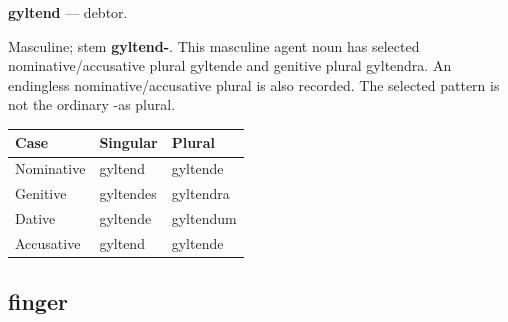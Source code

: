 \par\begin{minipage}{\linewidth}\raggedright
\textbf{gyltend} — debtor.

Masculine; stem \textbf{gyltend-}. This masculine agent noun has selected nominative/\allowbreak{}accusative plural gyltende and genitive plural gyltendra. An endingless nominative/\allowbreak{}accusative plural is also recorded. The selected pattern is not the ordinary -as plural.

\par\begingroup
\fontsize{10.5}{13.2}\selectfont
\setlength{\LTleft}{0pt}\setlength{\LTright}{\fill}
\noindent
\begin{tabular}{@{}>{\raggedright\arraybackslash}p{39.46mm}>{\raggedright\arraybackslash}p{39.46mm}>{\raggedright\arraybackslash}p{39.46mm}@{}}
\toprule
\textbf{Case} & \textbf{Singular} & \textbf{Plural} \\
\midrule
Nominative & gyltend & gyltende \\
Genitive & gyltendes & gyltendra \\
Dative & gyltende & gyltendum \\
Accusative & gyltend & gyltende \\
\bottomrule
\end{tabular}
\par\endgroup

\end{minipage}\par
{}
\subsection*{finger}

